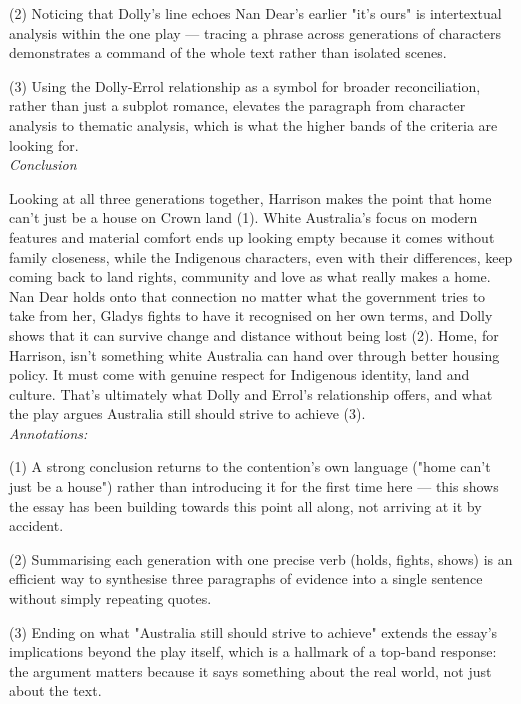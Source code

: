 \documentclass[a4paper]{article}
\begin{document}
(2) Noticing that Dolly's line echoes Nan Dear's earlier "it's ours" is intertextual analysis within the one play — tracing a phrase across generations of characters demonstrates a command of the whole text rather than isolated scenes.

(3) Using the Dolly-Errol relationship as a symbol for broader reconciliation, rather than just a subplot romance, elevates the paragraph from character analysis to thematic analysis, which is what the higher bands of the criteria are looking for.\\

\textit{Conclusion}

Looking at all three generations together, Harrison makes the point that home can't just be a house on Crown land (1). White Australia's focus on modern features and material comfort ends up looking empty because it comes without family closeness, while the Indigenous characters, even with their differences, keep coming back to land rights, community and love as what really makes a home. Nan Dear holds onto that connection no matter what the government tries to take from her, Gladys fights to have it recognised on her own terms, and Dolly shows that it can survive change and distance without being lost (2). Home, for Harrison, isn't something white Australia can hand over through better housing policy. It must come with genuine respect for Indigenous identity, land and culture. That's ultimately what Dolly and Errol's relationship offers, and what the play argues Australia still should strive to achieve (3).\\

\textit{Annotations:}

(1) A strong conclusion returns to the contention's own language ("home can't just be a house") rather than introducing it for the first time here — this shows the essay has been building towards this point all along, not arriving at it by accident.

(2) Summarising each generation with one precise verb (holds, fights, shows) is an efficient way to synthesise three paragraphs of evidence into a single sentence without simply repeating quotes.

(3) Ending on what "Australia still should strive to achieve" extends the essay's implications beyond the play itself, which is a hallmark of a top-band response: the argument matters because it says something about the real world, not just about the text.\\
\end{document}
